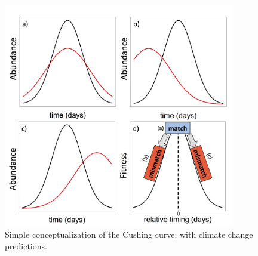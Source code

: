 \documentclass[11pt,letterpaper]{article}
\begin{document}
\begin{table}[ht!]
\caption{A comparison across studies of the type of performance data collected for the consumer across systems and taxonomic group}
\begin{center}
\end{center}
\end{table}
\clearpage

\begin{figure}[ht!]
\caption{Simple conceptualization of the Cushing curve; with climate change predictions.}
\begin{center}
\includegraphics[width=0.9\textwidth]{fig1_v1.png}
\end{center}
\end{figure}
\clearpage
\end{document}
